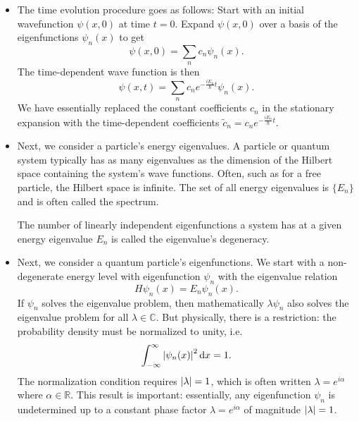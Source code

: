 \documentclass[11pt, a4paper]{article}
\newcommand{\diff}{\mathop{}\!\mathrm{d}} %
\begin{document}
\begin{itemize}
	\item The time evolution procedure goes as follows: Start with an initial wavefunction $ \psi(x, 0) $ at time $ t = 0 $. Expand $ \psi(x, 0) $ over a basis of the eigenfunctions $ \psi_{n}(x) $ to get
	\begin{equation*}
		\psi(x, 0) = \sum_{n} c_{n} \psi_{n}(x).
	\end{equation*}
	The time-dependent wave function is then
	\begin{equation*}
		\psi(x, t) = \sum_{n} c_{n}e^{-\frac{iE_{n}}{\hbar}t}\psi_{n}(x).
	\end{equation*}
	We have essentially replaced the constant coefficients $ c_{n} $ in the stationary expansion with the time-dependent coefficients $ \tilde{c}_{n} = c_{n}e^{-\frac{iE_{n}}{\hbar}t} $.
	
	\item Next, we consider a particle's energy eigenvalues. A particle or quantum system typically has as many eigenvalues as the dimension of the Hilbert space containing the system's wave functions. Often, such as for a free particle, the Hilbert space is infinite. The set of all energy eigenvalues is $ \{E_{n}\} $ and is often called the spectrum. 
	
	The number of linearly independent eigenfunctions a system has at a given energy eigenvalue $ E_{n} $ is called the eigenvalue's degeneracy.
	
	\item Next, we consider a quantum particle's eigenfunctions. We start with a non-degenerate energy level with eigenfunction $ \psi_{n} $ with the eigenvalue relation
	\begin{equation*}
		H\psi_{n}(x) = E_{n}\psi_{n}(x).
	\end{equation*}
	If $ \psi_{n} $ solves the eigenvalue problem, then mathematically $ \lambda \psi_{n} $ also solves the eigenvalue problem for all $ \lambda \in \mathbb{C} $. But physically, there is a restriction: the probability density must be normalized to unity, i.e. 
	\begin{equation*}
		\int_{-\infty}^{\infty} \abs{\psi_{n}(x)}^{2} \diff x = 1.
	\end{equation*}
	The normalization condition requires $ \abs{\lambda} = 1$, which is often written $ \lambda = e^{i \alpha} $ where $ \alpha \in \mathbb{R} $. This result is important: essentially, any eigenfunction $ \psi_{n} $ is undetermined up to a constant phase factor $ \lambda = e^{i\alpha} $ of magnitude $ \abs{\lambda} = 1 $. 


\end{itemize}
\end{document}
